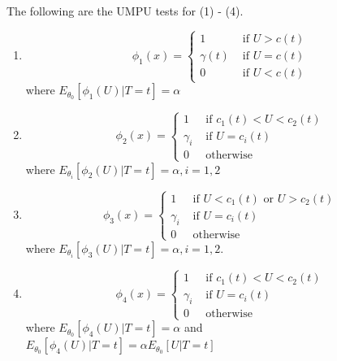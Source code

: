 \documentclass[12pt]{article}
\numberwithin{equation}{section}
\begin{document}
The following are the UMPU tests for (1) - (4).
\begin{enumerate}[(1)]
  \item %
  \begin{equation*}
    \phi_1(x) =
    \begin{cases}
      1           &\text{ if } U > c(t) \\
      \gamma(t)   &\text{ if } U = c(t) \\
      0           &\text{ if } U < c(t)
    \end{cases}
  \end{equation*}
  where $E_{\theta_0}[\phi_1(U) | T = t] = \alpha$
  \item %
  \begin{equation*}
    \phi_2(x) =
    \begin{cases}
      1          &\text{ if } c_1(t) < U < c_2(t) \\
      \gamma_i   &\text{ if } U = c_i(t) \\
      0          &\text{ otherwise}
    \end{cases}
  \end{equation*}
  where $E_{\theta_i}[\phi_2(U) | T = t] = \alpha, i = 1,2$
  \item %
  \begin{equation*}
    \phi_3(x) = 
    \begin{cases}
      1          &\text{ if } U < c_1(t) \text{ or } U > c_2(t) \\
      \gamma_i   &\text{ if } U = c_i(t) \\
      0          &\text{ otherwise}
    \end{cases}
  \end{equation*}
  where $E_{\theta_i}[\phi_3(U) | T = t] = \alpha, i = 1,2$.
  \item %
  \begin{equation*}
    \phi_4(x) =
    \begin{cases}
      1          &\text{ if } c_1(t) < U < c_2(t) \\
      \gamma_i   &\text{ if } U = c_i(t) \\
      0          &\text{ otherwise}
    \end{cases}
  \end{equation*}
  where $E_{\theta_0}[\phi_4(U) | T = t] = \alpha$ and \\
  $E_{\theta_0}[\phi_4(U) | T = t] = \alpha E_{\theta_0}[U | T = t]$
\end{enumerate}
\end{document}
